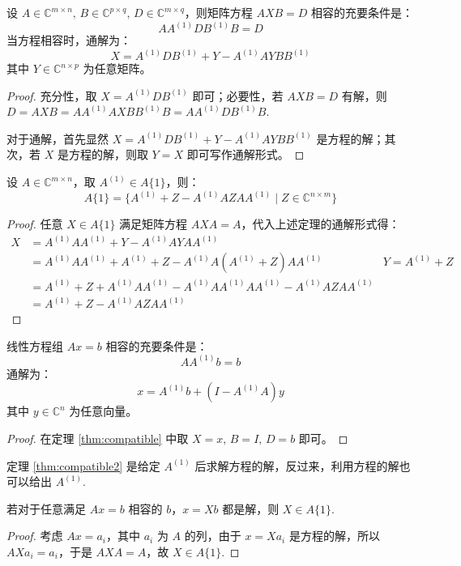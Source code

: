 \begin{theorem}
\label{thm:compatible}
设 $A\in\mathbb C^{m\times n},\,B\in\mathbb C^{p\times q},\,D\in\mathbb C^{m\times q}$，则矩阵方程 $AXB=D$ 相容的充要条件是：
\[
    AA^{(1)}DB^{(1)}B=D
\]
当方程相容时，通解为：
\[
    X=A^{(1)}DB^{(1)}+Y-A^{(1)}AYBB^{(1)}
\]
其中 $Y\in\mathbb C^{n\times p}$ 为任意矩阵。
\end{theorem}
\begin{proof}
充分性，取 $X=A^{(1)}DB^{(1)}$ 即可；必要性，若 $AXB=D$ 有解，则 $D=AXB=AA^{(1)}AXBB^{(1)}B=AA^{(1)}DB^{(1)}B$.

对于通解，首先显然 $X=A^{(1)}DB^{(1)}+Y-A^{(1)}AYBB^{(1)}$ 是方程的解；其次，若 $X$ 是方程的解，则取 $Y=X$ 即可写作通解形式。
\end{proof}

\begin{corollary}
设 $A\in\mathbb C^{m\times n}$，取 $A^{(1)}\in A\{1\}$，则：
\[
    A\{1\}=\{A^{(1)}+Z-A^{(1)}AZAA^{(1)}\mid Z\in\mathbb C^{n\times m}\}
\]
\end{corollary}
\begin{proof}
任意 $X\in A\{1\}$ 满足矩阵方程 $AXA=A$，代入上述定理的通解形式得：
\begin{align*}
    X&=A^{(1)}AA^{(1)}+Y-A^{(1)}AYAA^{(1)}\\
    &=A^{(1)}AA^{(1)}+A^{(1)}+Z-A^{(1)}A(A^{(1)}+Z)AA^{(1)}&Y=A^{(1)}+Z\\
    &=A^{(1)}+Z+A^{(1)}AA^{(1)}-A^{(1)}AA^{(1)}AA^{(1)}-A^{(1)}AZAA^{(1)}\\
    &=A^{(1)}+Z-A^{(1)}AZAA^{(1)}
\end{align*}
\end{proof}

\begin{theorem}
\label{thm:compatible2}
线性方程组 $Ax=b$ 相容的充要条件是：
\[
    AA^{(1)}b=b
\]
通解为：
\[
    x=A^{(1)}b+(I-A^{(1)}A)y
\]
其中 $y\in\mathbb C^{n}$ 为任意向量。
\end{theorem}
\begin{proof}
在定理 \ref{thm:compatible} 中取 $X=x,\,B=I,\,D=b$ 即可。
\end{proof}

定理 \ref{thm:compatible2} 是给定 $A^{(1)}$ 后求解方程的解，反过来，利用方程的解也可以给出 $A^{(1)}$.

\begin{theorem}
若对于任意满足 $Ax=b$ 相容的 $b$，$x=Xb$ 都是解，则 $X\in A\{1\}$.
\end{theorem}
\begin{proof}
考虑 $Ax=a_i$，其中 $a_i$ 为 $A$ 的列，由于 $x=Xa_i$ 是方程的解，所以 $AXa_i=a_i$，于是 $AXA=A$，故 $X\in A\{1\}$.
\end{proof}

